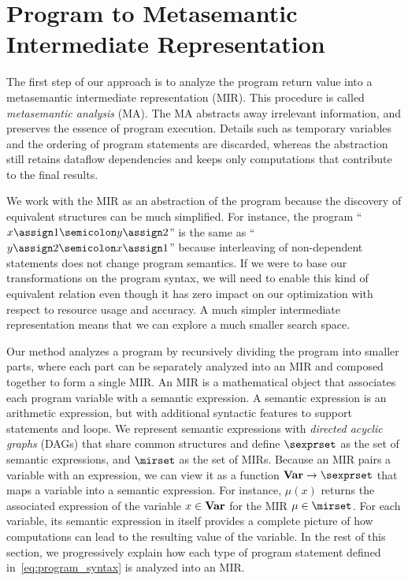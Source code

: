 \section{Program to Metasemantic Intermediate Representation}
\label{sec:program_to_mir}

The first step of our approach is to analyze the program return value
into a metasemantic intermediate representation (MIR).  This procedure is
called \emph{metasemantic analysis} (MA).  The MA abstracts away irrelevant
information, and preserves the essence of program execution.  Details such
as temporary variables and the ordering of program statements are discarded,
whereas the abstraction still retains dataflow dependencies and keeps only
computations that contribute to the final results.

We work with the MIR as an abstraction of the program because the discovery of
equivalent structures can be much simplified.  For instance, the program ``$x
\assign 1 \semicolon y \assign 2$'' is the same as ``$y \assign 2 \semicolon x
\assign 1$'' because interleaving of non-dependent statements does not change
program semantics.  If we were to base our transformations on the program
syntax, we will need to enable this kind of equivalent relation even though
it has zero impact on our optimization with respect to resource usage and
accuracy.  A much simpler intermediate representation means that we can explore
a much smaller search space.

Our method analyzes a program by recursively dividing the program into
smaller parts, where each part can be separately analyzed into an MIR and
composed together to form a single MIR\@.  An MIR is a mathematical object
that associates each program variable with a semantic expression.  A semantic
expression is an arithmetic expression, but with additional syntactic features
to support \iflit{} statements and \whilelit{} loops.  We represent semantic
expressions with \emph{directed acyclic graphs} (DAGs) that share common
structures and define $\sexprset$ as the set of semantic expressions, and
$\mirset$ as the set of MIRs.  Because an MIR pairs a variable with an
expression, we can view it as a function $\varset \to \sexprset$ that maps
a variable into a semantic expression.  For instance, $\mu(x)$ returns the
associated expression of the variable $x \in \mathbf{Var}$ for the MIR $\mu \in
\mirset$.  For each variable, its semantic expression in itself provides a
complete picture of how computations can lead to the resulting value of the
variable.  In the rest of this section, we progressively explain how each type
of program statement defined in~\eqref{eq:program_syntax} is analyzed into an
MIR\@.

